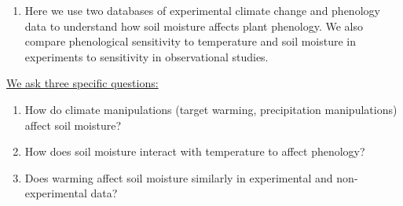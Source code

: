 \documentclass{article}
\begin{document}
\begin{singlespace}
\begin{enumerate}
\item Here we use two databases of experimental climate change and phenology data to understand how soil moisture affects plant phenology. We also compare phenological sensitivity to temperature and soil moisture in experiments to sensitivity in observational studies. 
\end{enumerate}
 \underline{We ask three specific questions:}
\begin{enumerate}
\item{How do climate manipulations (target warming, precipitation manipulations) affect soil moisture?}
\item{How does soil moisture interact with temperature to affect phenology?}
\item{Does warming affect soil moisture similarly in experimental and non-experimental data?}
\end{enumerate}
\end{singlespace}
\end{document}
